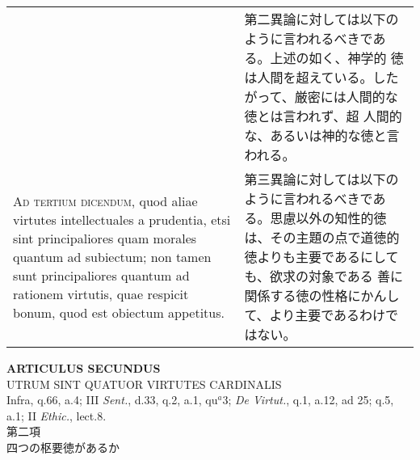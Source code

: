 \documentclass[10pt]{jsarticle}
\begin{document}
\begin{longtable}{p{21em}p{21em}}
&

 第二異論に対しては以下のように言われるべきである。上述の如く、神学的
 徳は人間を超えている。したがって、厳密には人間的な徳とは言われず、超
 人間的な、あるいは神的な徳と言われる。

 
\\



{\scshape Ad tertium dicendum}, quod aliae virtutes intellectuales a
prudentia, etsi sint principaliores quam morales quantum ad subiectum;
non tamen sunt principaliores quantum ad rationem virtutis, quae
respicit bonum, quod est obiectum appetitus.


&

 第三異論に対しては以下のように言われるべきである。思慮以外の知性的徳
 は、その主題の点で道徳的徳よりも主要であるにしても、欲求の対象である
 善に関係する徳の性格にかんして、より主要であるわけではない。
 

\end{longtable}
\newpage

\begin{center}
{\Large {\bf ARTICULUS SECUNDUS}}\\
{\large UTRUM SINT QUATUOR VIRTUTES CARDINALIS}\\
{\footnotesize Infra, q.66, a.4; III {\itshape Sent.}, d.33, q.2, a.1, qu$^{a}$3; {\itshape De Virtut.}, q.1, a.12, ad 25; q.5, a.1; II {\itshape Ethic.}, lect.8.}\\
{\Large 第二項\\四つの枢要徳があるか}
\end{center}
\end{document}
